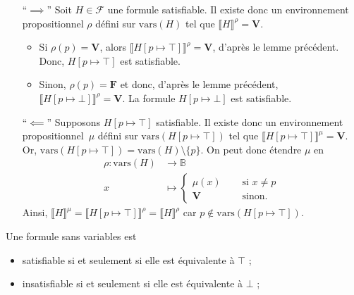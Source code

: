 \begin{prv}
	\begin{itemize}
		\item[``$\implies$''] Soit $H \in \mathcal{F}$\/ une formule satisfiable. Il existe donc  un environnement propositionnel $\rho$\/ défini sur $\mathrm{vars}(H)$\/ tel que $\llbracket H \rrbracket^\rho = \mathbf{V}$.
			\begin{itemize}
				\item Si $\rho(p) = \mathbf{V}$, alors $\Big\llbracket H[p\mapsto \top] \Big\rrbracket^\rho = \mathbf{V}$, d'après le lemme précédent. Donc, $H[p\mapsto \top ]$\/ est satisfiable.
				\item Sinon, $\rho(p) = \mathbf{F}$\/ et donc, d'après le lemme précédent, $\Big\llbracket H[p\mapsto \bot] \Big\rrbracket^\rho = \mathbf{V}$. La formule $H[p\mapsto \bot]$\/ est satisfiable.
			\end{itemize}
		\item[``$\impliedby$''] Supposons $H[p\mapsto \top]$\/ satisfiable. Il existe donc un environnement propositionnel~$\mu$\/ défini sur $\mathrm{vars}(H[p\mapsto \top])$ tel que $\llbracket H[p\mapsto \top] \rrbracket^\mu = \mathbf{V}$. Or, $\mathrm{vars}(H[p\mapsto \top]) = \mathrm{vars}(H) \setminus \{p\}$. On peut donc étendre $\mu$\/ en
			\begin{align*}
				\rho: \mathrm{vars}(H) &\longrightarrow \mathds{B} \\
				x &\longmapsto \begin{cases}
					\mu(x) &\quad \text{ si } x \neq p\\
					\mathbf{V} &\quad \text{ sinon}.
				\end{cases}
			\end{align*}
			Ainsi, $\llbracket H \rrbracket^\mu = \llbracket H[p \mapsto \top] \rrbracket^\rho = \llbracket H \rrbracket^\rho$ car $p\not\in \mathrm{vars}(H[p \mapsto \top])$.
	\end{itemize}
\end{prv}

\begin{lem}
	Une formule sans variables est
	\begin{itemize}
		\item satisfiable si et seulement si elle est équivalente à $\top$ ;
		\item insatisfiable si et seulement si elle est équivalente à $\bot$ ;
	\end{itemize}
\end{lem}

